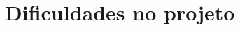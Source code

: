 \section{Dificuldades no projeto}
\begin{comment}
Durante a implementação do projeto se tiveram algumas dificuldades mencionadas a continuação:
\begin{itemize}
	\item Implementar o parser de STRIPS para o formato Json implicava usar expressões regulares de forma correta considerando todos os casos possíveis
	\item Encontrar uma formula para ter um índice único para cada proposição no problema
	\item A extração da solução tinha que fazer o contrario à função que encontrava um ID para cada proposição sem errar
	\item Mudar do grafo em Blackbox para um archivo CNF porque tinha muito pre-processamento ao momento de encontrar as pre-ações de cada ação
	\item Implementar as relações de mutex em Blackbox
	\item Encontrar a forma de dizer que as metas não se encontravam no último nível e portanto esse CNF não era satisfazível. A solução foi colocar duas cláusulas da forma $p$ e $\lnot p$, desta forma nunca sería verdadeiro todo esse modelo porque ambas não podem ser verdade à vez
\end{itemize}
\end{comment}